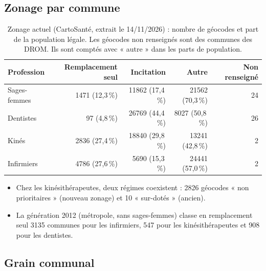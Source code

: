 \subsection{Zonage par commune}\label{a4-sec:res-zonage}
\begin{table}[h]
\centering\small
\begin{tabular}{@{}lrrrr@{}}
\toprule
Profession & Remplacement seul & Incitation & Autre & Non renseigné \\
\midrule
Sages-femmes & \num{1471} \;(12,3\,\%) & \num{11862} \;(17,4\,\%) & \num{21562} \;(70,3\,\%) & 24 \\
Dentistes & 97 \;(4,8\,\%) & \num{26769} \;(44,4\,\%) & \num{8027} \;(50,8\,\%) & 26 \\
Kinés & \num{2836} \;(27,4\,\%) & \num{18840} \;(29,8\,\%) & \num{13241} \;(42,8\,\%) & 2 \\
Infirmiers & \num{4786} \;(27,6\,\%) & \num{5690} \;(15,3\,\%) & \num{24441} \;(57,0\,\%) & 2 \\
\bottomrule
\end{tabular}
\caption{Zonage actuel (CartoSanté, extrait le 14/11/2026) : nombre de géocodes et part de la population
légale\mesure{}. Les géocodes non renseignés sont des communes des DROM. Ils sont comptés avec « autre » dans les
parts de population.}
\label{a4-tab:zonage}
\end{table}

\begin{itemize}
  \item Chez les kinésithérapeutes, deux régimes coexistent : \num{2826} géocodes « non prioritaires » (nouveau
  zonage) et 10 « sur-dotés » (ancien)\mesure{}.
  \item La génération 2012 (métropole, sans sages-femmes) classe en remplacement seul \num{3135} communes pour
  les infirmiers, 547 pour les kinésithérapeutes et 908 pour les dentistes\mesure{}.
\end{itemize}

\subsection{Grain communal}\label{a4-sec:res-grain}

